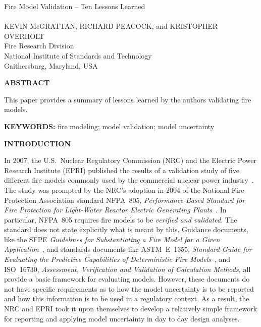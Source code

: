 \documentclass[fleqn,b5paper]{article}
\begin{document}
\renewcommand{\thefootnote}{\sf \arabic{footnote}}
\renewcommand{\d}{\mathrm{d}}
\renewcommand{\labelitemi}{{\scriptsize $\bullet$}}
\renewcommand{\labelitemii}{{\scriptsize $\bullet$}}




\begin{flushleft}
{\helvb Fire Model Validation -- Ten Lessons Learned}\\
\hspace{1in}\\
\helvn KEVIN McGRATTAN\footnotemark[1], RICHARD PEACOCK\footnotemark[1], and KRISTOPHER OVERHOLT\footnotemark[1]  \\
\footnotemark[1] Fire Research Division \\
National Institute of Standards and Technology \\
Gaithersburg, Maryland, USA
\end{flushleft}
\rm

\vspace{\parskip}
{\bf ABSTRACT}

This paper provides a summary of lessons learned by the authors validating fire models.

\vspace{\parskip}
{\bf KEYWORDS:} fire modeling; model validation; model uncertainty

\vspace{\parskip}
{\bf INTRODUCTION}

In 2007, the U.S.~Nuclear Regulatory Commission (NRC) and the Electric Power Research Institute (EPRI) published the results of a validation study of five different fire models commonly used by the commercial nuclear power industry~\cite{NUREG_1824}. The study was prompted by the NRC's adoption in 2004 of the National Fire Protection Association standard NFPA~805, {\em Performance-Based Standard for Fire Protection for Light-Water Reactor Electric Generating Plants}~\cite{NFPA_805}. In particular, NFPA~805 requires fire models to be {\em verified and validated}. The standard does not state explicitly what is meant by this. Guidance documents, like the SFPE {\em Guidelines for Substantiating a Fire Model for a Given Application}~\cite{SFPE_G.06}, and standards documents like ASTM~E~1355, {\em Standard Guide for Evaluating the Predictive Capabilities of Deterministic Fire Models}~\cite{ASTM:E1355}, and ISO~16730, {\em Assessment, Verification and Validation of Calculation Methods,} all provide a basic framework for evaluating models. However, these documents do not have specific requirements as to how the model uncertainty is to be reported and how this information is to be used in a regulatory context. As a result, the NRC and EPRI took it upon themselves to develop a relatively simple framework for reporting and applying model uncertainty in day to day design analyses.
\end{document}
